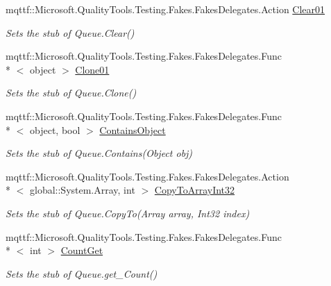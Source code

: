 \begin{DoxyCompactItemize}
\item 
mqttf\-::\-Microsoft.\-Quality\-Tools.\-Testing.\-Fakes.\-Fakes\-Delegates.\-Action \hyperlink{class_system_1_1_collections_1_1_fakes_1_1_stub_queue_af68f14110d792e074822286dfb893c60}{Clear01}
\begin{DoxyCompactList}\small\item\em Sets the stub of Queue.\-Clear()\end{DoxyCompactList}\item 
mqttf\-::\-Microsoft.\-Quality\-Tools.\-Testing.\-Fakes.\-Fakes\-Delegates.\-Func\\*
$<$ object $>$ \hyperlink{class_system_1_1_collections_1_1_fakes_1_1_stub_queue_a8b9b63abe428785b998884d2cf3d6e69}{Clone01}
\begin{DoxyCompactList}\small\item\em Sets the stub of Queue.\-Clone()\end{DoxyCompactList}\item 
mqttf\-::\-Microsoft.\-Quality\-Tools.\-Testing.\-Fakes.\-Fakes\-Delegates.\-Func\\*
$<$ object, bool $>$ \hyperlink{class_system_1_1_collections_1_1_fakes_1_1_stub_queue_ae37b8d6865c85fb22a8dca10d9ba8661}{Contains\-Object}
\begin{DoxyCompactList}\small\item\em Sets the stub of Queue.\-Contains(\-Object obj)\end{DoxyCompactList}\item 
mqttf\-::\-Microsoft.\-Quality\-Tools.\-Testing.\-Fakes.\-Fakes\-Delegates.\-Action\\*
$<$ global\-::\-System.\-Array, int $>$ \hyperlink{class_system_1_1_collections_1_1_fakes_1_1_stub_queue_ad8c9521f8338e20a620d8880b89fa07b}{Copy\-To\-Array\-Int32}
\begin{DoxyCompactList}\small\item\em Sets the stub of Queue.\-Copy\-To(\-Array array, Int32 index)\end{DoxyCompactList}\item 
mqttf\-::\-Microsoft.\-Quality\-Tools.\-Testing.\-Fakes.\-Fakes\-Delegates.\-Func\\*
$<$ int $>$ \hyperlink{class_system_1_1_collections_1_1_fakes_1_1_stub_queue_a982b9d62a67117f1a73bf2a1ab9cb614}{Count\-Get}
\begin{DoxyCompactList}\small\item\em Sets the stub of Queue.\-get\-\_\-\-Count()\end{DoxyCompactList}\item 

\end{DoxyCompactItemize}
